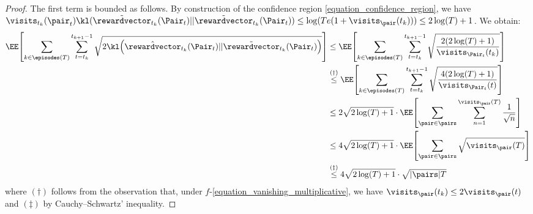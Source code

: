 \documentclass[preprint,cleveref,12pt]{colt2025}
\DeclarePairedDelimiter{\brackets}{[}{]}	%
\DeclarePairedDelimiter{\parens}{(}{)}	%
\DeclarePairedDelimiter{\abs}{\lvert}{\rvert}	%
\newcommand{\tsqrt}[1]{{\textstyle\sqrt{#1}}} %
\def\reward{\rewardvector}
\begin{document}
\begin{proof}
        The first term is bounded as follows.
        By construction of the confidence region \eqref{equation_confidence_region}, we have $\visits_{t_k}(\pair_t) \kl(\tilde{\reward}_{t_k}(\Pair_t)||\tilde{\reward}_{t_k}(\Pair_t)) \le \log(T e (1 + \visits_\pair (t_k))) \le 2 \log(T) + 1$.
        We obtain:
        \begin{align*}
            \EE \brackets*{
                \sum_{k \in \episodes(T)}
                \sum_{t = t_k}^{t_{k+1}-1}
                \sqrt{
                    2 \kl\parens*{
                        \hat{\reward}_{t_k}(\Pair_t)
                        ||
                        \tilde{\reward}_{t_k}(\Pair_t) 
                    }
                }
            }
            & \le
            \EE \brackets*{
                \sum_{k \in \episodes(T)}
                \sum_{t = t_k}^{t_{k+1}-1}
                \sqrt{
                    \frac{2 (2\log(T) + 1)}{\visits_{\Pair_t}(t_k)}
                }
            }
            \\
            & \overset{(\dagger)}\le 
            \EE \brackets*{
                \sum_{k \in \episodes(T)}
                \sum_{t = t_k}^{t_{k+1}-1}
                \sqrt{
                    \frac{4 (2\log(T) + 1)}{\visits_{\Pair_t}(t)}
                }
            }
            \\
            & \le 
            2\sqrt{2 \log(T) + 1}
            \cdot 
            \EE \brackets*{
                \sum_{\pair \in \pairs}
                \sum_{n=1}^{\visits_\pair(T)}
                \frac 1{\sqrt{n}}
            }
            \\
            & \le 
            4 \sqrt{2 \log(T) + 1}
            \cdot 
            \EE \brackets*{
                \sum_{\pair \in \pairs}
                \sqrt{\visits_\pair (T)}
            }
            \\
            & \overset{(\ddagger)}\le 
            4 \sqrt{2 \log(T) + 1}
            \cdot 
            \tsqrt{\abs{\pairs} T}
        \end{align*}
        where $(\dagger)$ follows from the observation that, under $f$-\eqref{equation_vanishing_multiplicative}, we have $\visits_\pair (t_k) \le 2 \visits_{\pair}(t)$ and $(\ddagger)$ by Cauchy--Schwartz' inequality. 


\end{proof}
\end{document}
